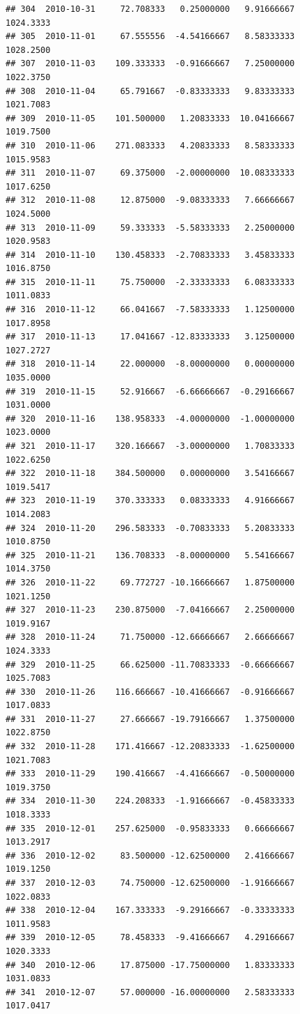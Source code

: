\documentclass[
]{article}
\begin{document}
\begin{verbatim}
## 304  2010-10-31     72.708333   0.25000000   9.91666667    1024.3333
## 305  2010-11-01     67.555556  -4.54166667   8.58333333    1028.2500
## 307  2010-11-03    109.333333  -0.91666667   7.25000000    1022.3750
## 308  2010-11-04     65.791667  -0.83333333   9.83333333    1021.7083
## 309  2010-11-05    101.500000   1.20833333  10.04166667    1019.7500
## 310  2010-11-06    271.083333   4.20833333   8.58333333    1015.9583
## 311  2010-11-07     69.375000  -2.00000000  10.08333333    1017.6250
## 312  2010-11-08     12.875000  -9.08333333   7.66666667    1024.5000
## 313  2010-11-09     59.333333  -5.58333333   2.25000000    1020.9583
## 314  2010-11-10    130.458333  -2.70833333   3.45833333    1016.8750
## 315  2010-11-11     75.750000  -2.33333333   6.08333333    1011.0833
## 316  2010-11-12     66.041667  -7.58333333   1.12500000    1017.8958
## 317  2010-11-13     17.041667 -12.83333333   3.12500000    1027.2727
## 318  2010-11-14     22.000000  -8.00000000   0.00000000    1035.0000
## 319  2010-11-15     52.916667  -6.66666667  -0.29166667    1031.0000
## 320  2010-11-16    138.958333  -4.00000000  -1.00000000    1023.0000
## 321  2010-11-17    320.166667  -3.00000000   1.70833333    1022.6250
## 322  2010-11-18    384.500000   0.00000000   3.54166667    1019.5417
## 323  2010-11-19    370.333333   0.08333333   4.91666667    1014.2083
## 324  2010-11-20    296.583333  -0.70833333   5.20833333    1010.8750
## 325  2010-11-21    136.708333  -8.00000000   5.54166667    1014.3750
## 326  2010-11-22     69.772727 -10.16666667   1.87500000    1021.1250
## 327  2010-11-23    230.875000  -7.04166667   2.25000000    1019.9167
## 328  2010-11-24     71.750000 -12.66666667   2.66666667    1024.3333
## 329  2010-11-25     66.625000 -11.70833333  -0.66666667    1025.7083
## 330  2010-11-26    116.666667 -10.41666667  -0.91666667    1017.0833
## 331  2010-11-27     27.666667 -19.79166667   1.37500000    1022.8750
## 332  2010-11-28    171.416667 -12.20833333  -1.62500000    1021.7083
## 333  2010-11-29    190.416667  -4.41666667  -0.50000000    1019.3750
## 334  2010-11-30    224.208333  -1.91666667  -0.45833333    1018.3333
## 335  2010-12-01    257.625000  -0.95833333   0.66666667    1013.2917
## 336  2010-12-02     83.500000 -12.62500000   2.41666667    1019.1250
## 337  2010-12-03     74.750000 -12.62500000  -1.91666667    1022.0833
## 338  2010-12-04    167.333333  -9.29166667  -0.33333333    1011.9583
## 339  2010-12-05     78.458333  -9.41666667   4.29166667    1020.3333
## 340  2010-12-06     17.875000 -17.75000000   1.83333333    1031.0833
## 341  2010-12-07     57.000000 -16.00000000   2.58333333    1017.0417

\end{verbatim}
\end{document}
